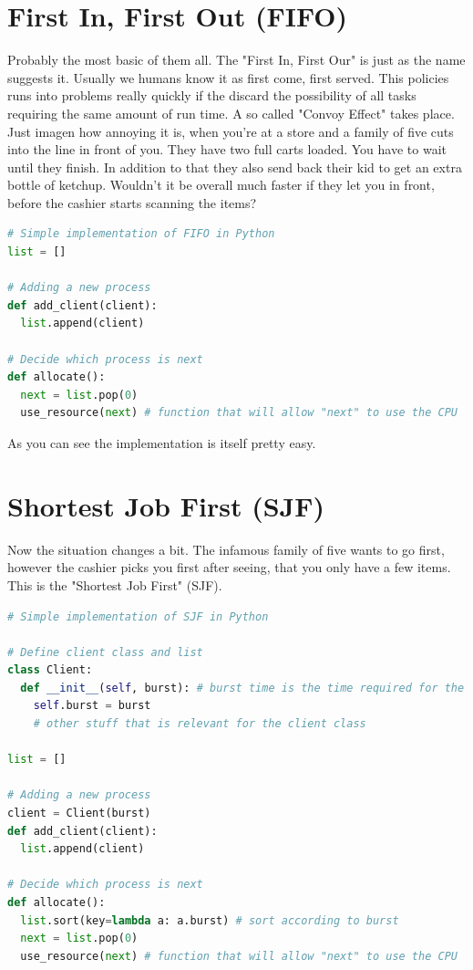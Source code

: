 \documentclass{report}
\begin{document}
\section{First In, First Out (FIFO)}

Probably the most basic of them all.
The "First In, First Our" is just as the name suggests it. 
Usually we humans know it as first come, first served. 
This policies runs into problems really quickly if the discard the possibility of all tasks requiring the same amount of run time. 
A so called "Convoy Effect" takes place. 
Just imagen how annoying it is, when you're at a store and a family of five cuts into the line in front of you. 
They have two full carts loaded. You have to wait until they finish. 
In addition to that they also send back their kid to get an extra bottle of ketchup. 
Wouldn't it be overall much faster if they let you in front, before the cashier starts scanning the items?

\begin{lstlisting}[language=Python, style=colorEX]
# Simple implementation of FIFO in Python
list = []

# Adding a new process
def add_client(client):
  list.append(client)

# Decide which process is next
def allocate():
  next = list.pop(0)
  use_resource(next) # function that will allow "next" to use the CPU
\end{lstlisting}

As you can see the implementation is itself pretty easy.
\pagebreak

\section{Shortest Job First (SJF)}

Now the situation changes a bit. 
The infamous family of five wants to go first, however the cashier picks you first after seeing, that you only have a few items.
This is the "Shortest Job First" (SJF). 

\begin{lstlisting}[language=Python, style=colorEX]
# Simple implementation of SJF in Python

# Define client class and list
class Client:
  def __init__(self, burst): # burst time is the time required for the process to finish
    self.burst = burst
    # other stuff that is relevant for the client class

list = []

# Adding a new process
client = Client(burst) 
def add_client(client): 
  list.append(client)

# Decide which process is next
def allocate():
  list.sort(key=lambda a: a.burst) # sort according to burst
  next = list.pop(0)
  use_resource(next) # function that will allow "next" to use the CPU
\end{lstlisting}
\end{document}
